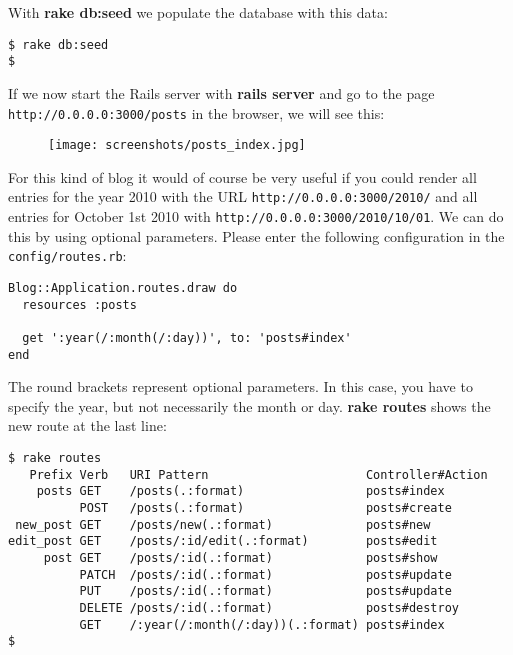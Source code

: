 \documentclass[a4paper]{book}
\newcounter{tab}[chapter]
\begin{document}
With \textbf{rake db:seed} we populate the database with this data:

\begin{shaded}\begin{verbatim}
$ rake db:seed
$
\end{verbatim}\end{shaded}

If we now start the Rails server with \textbf{rails server} and go to the page \texttt{http://0.0.0.0:3000/posts} in the browser, we will see this:

\begin{figure}[htbp]
\centering
\texttt{[image: screenshots/posts\_index.jpg]}
\end{figure}

For this kind of blog it would of course be very useful if you could render all entries for the year 2010 with the URL \texttt{http://0.0.0.0:3000/2010/} and all entries for October 1st 2010 with \texttt{http://0.0.0.0:3000/2010/10/01}. We can do this by using optional parameters. Please enter the following configuration in the \texttt{config/routes.rb}:

\begin{shaded}\begin{verbatim}
Blog::Application.routes.draw do
  resources :posts

  get ':year(/:month(/:day))', to: 'posts#index'
end
\end{verbatim}\end{shaded}

The round brackets represent optional parameters. In this case, you have to specify the year, but not necessarily the month or day. \textbf{rake routes} shows the new route at the last line:

\begin{shaded}\begin{verbatim}
$ rake routes
   Prefix Verb   URI Pattern                      Controller#Action
    posts GET    /posts(.:format)                 posts#index
          POST   /posts(.:format)                 posts#create
 new_post GET    /posts/new(.:format)             posts#new
edit_post GET    /posts/:id/edit(.:format)        posts#edit
     post GET    /posts/:id(.:format)             posts#show
          PATCH  /posts/:id(.:format)             posts#update
          PUT    /posts/:id(.:format)             posts#update
          DELETE /posts/:id(.:format)             posts#destroy
          GET    /:year(/:month(/:day))(.:format) posts#index
$
\end{verbatim}\end{shaded}
\end{document}

